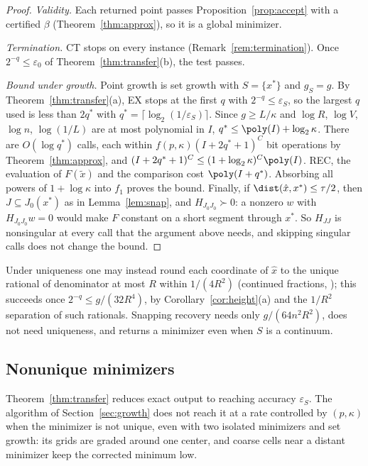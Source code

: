 \begin{proof}
\emph{Validity.} Each returned point passes Proposition~\ref{prop:accept}
with a certified $\beta$ (Theorem~\ref{thm:approx}), so it is a global
minimizer.

\emph{Termination.} CT stops on every instance
(Remark~\ref{rem:termination}). Once $2^{-q}\le\varepsilon_0$ of
Theorem~\ref{thm:transfer}(b), the test passes.

\emph{Bound under growth.} Point growth is set growth with $S=\{x^*\}$ and
$g_S=g$. By Theorem~\ref{thm:transfer}(a), EX stops at the first $q$ with
$2^{-q}\le\varepsilon_S$, so the largest $q$ used is less than
$2q^*$ with $q^*=\lceil\log_2(1/\varepsilon_S)\rceil$. Since $g\ge L/\kappa$
and $\log R$, $\log V$, $\log n$, $\log(1/L)$ are at most polynomial in $I$,
$q^*\le\poly(I)+\log_2\kappa$. There are $O(\log q^*)$ calls, each within
$f(p,\kappa)(I+2q^*+1)^C$ bit operations by Theorem~\ref{thm:approx}, and
$(I+2q^*+1)^C\le(1+\log_2\kappa)^{C}\poly(I)$. REC, the evaluation of
$F(\tilde x)$ and the comparison cost $\poly(I+q^*)$. Absorbing all powers
of $1+\log\kappa$ into $f_1$ proves the bound. Finally, if
$\dist(\hat x,x^*)\le\tau/2$, then $J\subseteq J_0(x^*)$ as in
Lemma~\ref{lem:snap}, and $H_{J_0J_0}\succ0$: a nonzero $w$ with
$H_{J_0J_0}w=0$ would make $F$ constant on a short segment through $x^*$.
So $H_{JJ}$ is nonsingular at every call that the argument above needs, and
skipping singular calls does not change the bound.
\end{proof}

\begin{remark}\label{rem:cf}
Under uniqueness one may instead round each coordinate of $\hat x$ to the
unique rational of denominator at most $R$ within $1/(4R^2)$ (continued
fractions, \cite[Theorem~5.1.9]{GrotschelLovaszSchrijver1988}); this succeeds
once $2^{-q}\le g/(32R^4)$, by Corollary~\ref{cor:height}(a) and the
$1/R^2$ separation of such rationals. Snapping recovery needs only
$g/(64n^2R^2)$, does not need uniqueness, and returns a minimizer even when
$S$ is a continuum.
\end{remark}

\subsection{Nonunique minimizers}\label{sec:exact-nonunique}

Theorem~\ref{thm:transfer} reduces exact output to reaching accuracy
$\varepsilon_S$. The algorithm of Section~\ref{sec:growth} does not reach it
at a rate controlled by $(p,\kappa)$ when the minimizer is not unique, even
with two isolated minimizers and set growth: its grids are graded around one
center, and coarse cells near a distant minimizer keep the corrected minimum
low.

